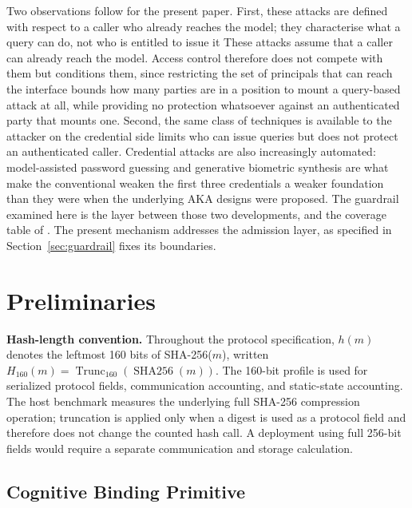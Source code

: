 \documentclass[cmc,article,submit,moreauthors,pdftex]{Definitions/tsp}
\providecommand{\DIFadd}[1]{{\protect\color{blue} \sf #1}} %
\providecommand{\DIFdel}[1]{{\protect\color{red} \scriptsize #1}} %
\providecommand{\DIFaddbegin}{} %
\providecommand{\DIFaddend}{} %
\providecommand{\DIFdelbegin}{} %
\providecommand{\DIFdelend}{} %
\begin{document}
\DIFdelbegin \DIFdel{Two observations follow for the present paper. First, these attacks are defined with respect to a caller who already reaches the model; they characterise what a query can do, not who is entitled to issue it}\DIFdelend \DIFaddbegin \DIFadd{These attacks assume that a caller can already reach the model}\DIFaddend . Access control \DIFdelbegin \DIFdel{therefore does not compete with them but conditions them, since restricting the set of principals that can reach the interface bounds how many parties are in a position to mount a query-based attack at all, while providing no protection whatsoever against an authenticated party that mounts one. Second, the same class of techniques is available to the attacker on the credential side}\DIFdelend \DIFaddbegin \DIFadd{limits who can issue queries but does not protect an authenticated caller. Credential attacks are also increasingly automated}\DIFaddend : model-assisted password guessing \cite{hitaj2019passgan,xu2023passbert} and generative biometric synthesis \cite{tolosana2020deepfakes} \DIFdelbegin \DIFdel{are what make the conventional }\DIFdelend \DIFaddbegin \DIFadd{weaken the }\DIFaddend first three credentials\DIFdelbegin \DIFdel{a weaker foundation than they were when the underlying AKA designs were proposed. The guardrail examined here is the layer between those two developments, and the coverage table of }\DIFdelend \DIFaddbegin \DIFadd{. The present mechanism addresses the admission layer, as specified in }\DIFaddend Section~\ref{sec:guardrail}\DIFdelbegin \DIFdel{fixes its boundaries}\DIFdelend .

\section{Preliminaries}

\DIFaddbegin \DIFadd{\textbf{Hash-length convention.} Throughout the protocol specification, $h(m)$ denotes the leftmost 160 bits of SHA-256($m$), written $H_{160}(m)=\operatorname{Trunc}_{160}(\operatorname{SHA256}(m))$. The 160-bit profile is used for serialized protocol fields, communication accounting, and static-state accounting. The host benchmark measures the underlying full SHA-256 compression operation; truncation is applied only when a digest is used as a protocol field and therefore does not change the counted hash call. A deployment using full 256-bit fields would require a separate communication and storage calculation.
}

\DIFaddend \subsection{Cognitive Binding Primitive}\label{sec:ceaf}
\end{document}
